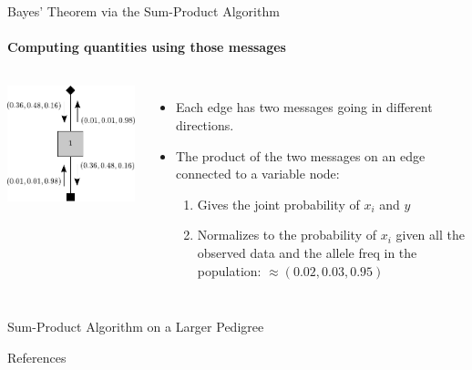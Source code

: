 \documentclass[letter,graphicx]{beamer}
\begin{document}
\begin{frame}{Bayes' Theorem via the Sum-Product Algorithm}
\framesubtitle{Computing quantities using those messages}

\begin{columns}
\includegraphics[height = 0.45\textheight]{./images/single-node-sum-product-d.pdf}
\begin{itemize}
\item Each edge has two messages going in different directions.
\item The product of the two messages on an edge connected to a variable node:
\begin{enumerate}
\item Gives the joint probability of $x_i$ and $y$ 
\item Normalizes to the probability of $x_i$ given all the observed data and the allele freq in the population: $\mbox{}\approx (0.02, 0.03, 0.95)$
\end{enumerate}
\end{itemize}
\end{columns}
\end{frame}


\begin{frame}{Sum-Product Algorithm on a Larger Pedigree}
\end{frame}





\begin{frame}{References}
\tiny



\end{frame}
\end{document}
